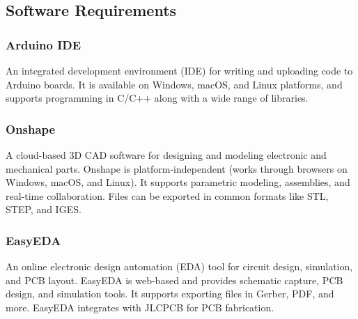 \subsection{Software Requirements}

\subsubsection{Arduino IDE}
An integrated development environment (IDE) for writing and uploading code to Arduino boards. It is available on Windows, macOS, and Linux platforms, and supports programming in C/C++ along with a wide range of libraries.
\subsubsection{Onshape}
A cloud-based 3D CAD software for designing and modeling electronic and mechanical parts. Onshape is platform-independent (works through browsers on Windows, macOS, and Linux). It supports parametric modeling, assemblies, and real-time collaboration. Files can be exported in common formats like STL, STEP, and IGES.
\subsubsection{EasyEDA}
An online electronic design automation (EDA) tool for circuit design, simulation, and PCB layout. EasyEDA is web-based and provides schematic capture, PCB design, and simulation tools. It supports exporting files in Gerber, PDF, and more. EasyEDA integrates with JLCPCB for PCB fabrication.
